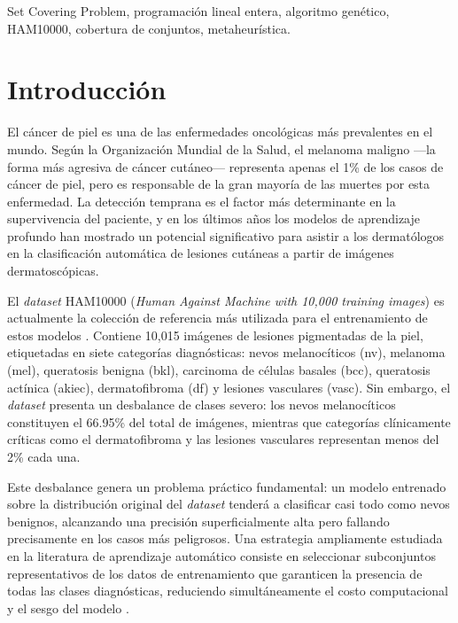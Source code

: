 \documentclass[conference]{IEEEtran}
\begin{document}
\begin{IEEEkeywords}
Set Covering Problem, programación lineal entera, algoritmo genético, HAM10000, cobertura de conjuntos, metaheurística.
\end{IEEEkeywords}

\section{Introducción}

El cáncer de piel es una de las enfermedades oncológicas más prevalentes en el mundo. Según la Organización Mundial de la Salud, el melanoma maligno —la forma más agresiva de cáncer cutáneo— representa apenas el 1\% de los casos de cáncer de piel, pero es responsable de la gran mayoría de las muertes por esta enfermedad. La detección temprana es el factor más determinante en la supervivencia del paciente, y en los últimos años los modelos de aprendizaje profundo han mostrado un potencial significativo para asistir a los dermatólogos en la clasificación automática de lesiones cutáneas a partir de imágenes dermatoscópicas.

El \textit{dataset} HAM10000 (\textit{Human Against Machine with 10,000 training images}) es actualmente la colección de referencia más utilizada para el entrenamiento de estos modelos \cite{tschandl2018}. Contiene 10,015 imágenes de lesiones pigmentadas de la piel, etiquetadas en siete categorías diagnósticas: nevos melanocíticos (nv), melanoma (mel), queratosis benigna (bkl), carcinoma de células basales (bcc), queratosis actínica (akiec), dermatofibroma (df) y lesiones vasculares (vasc). Sin embargo, el \textit{dataset} presenta un desbalance de clases severo: los nevos melanocíticos constituyen el 66.95\% del total de imágenes, mientras que categorías clínicamente críticas como el dermatofibroma y las lesiones vasculares representan menos del 2\% cada una.

Este desbalance genera un problema práctico fundamental: un modelo entrenado sobre la distribución original del \textit{dataset} tenderá a clasificar casi todo como nevos benignos, alcanzando una precisión superficialmente alta pero fallando precisamente en los casos más peligrosos. Una estrategia ampliamente estudiada en la literatura de aprendizaje automático consiste en seleccionar subconjuntos representativos de los datos de entrenamiento que garanticen la presencia de todas las clases diagnósticas, reduciendo simultáneamente el costo computacional y el sesgo del modelo \cite{tschandl2018}.
\end{document}

